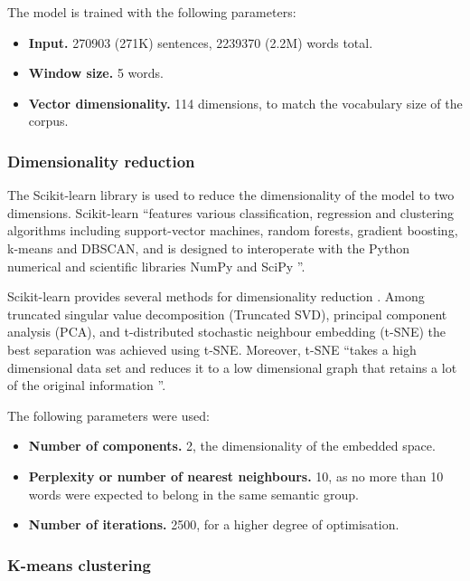 \documentclass[14pt, a4paper]{extreport}
\begin{document}
The model is trained with the following parameters:

\begin{itemize}
  \item \textbf{Input.} 270903 (271K) sentences, 2239370 (2.2M) words total.
  \item \textbf{Window size.} 5 words.
  \item \textbf{Vector dimensionality.} 114 dimensions, to match the vocabulary size of the corpus.
\end{itemize}
      \subsubsection{Dimensionality reduction}
The Scikit-learn library is used to reduce the dimensionality of the model to two dimensions. Scikit-learn ``features various classification, regression and clustering algorithms including support-vector machines, random forests, gradient boosting, k-means and DBSCAN, and is designed to interoperate with the Python numerical and scientific libraries NumPy and SciPy \parencite{scikit}''.

Scikit-learn provides several methods for dimensionality reduction \parencite{tsne}. Among truncated singular value decomposition (Truncated SVD), principal component analysis (PCA), and t-distributed stochastic neighbour embedding (t-SNE) the best separation was achieved using t-SNE. Moreover, t-SNE ``takes a high dimensional data set and reduces it to a low dimensional graph that retains a lot of the original information \parencite{dimred}''.

The following parameters were used:

\begin{itemize}
  \item \textbf{Number of components.} 2, the dimensionality of the embedded space.
  \item \textbf{Perplexity or number of nearest neighbours.} 10, as no more than 10 words were expected to belong in the same semantic group.
  \item \textbf{Number of iterations.} 2500, for a higher degree of optimisation.
\end{itemize}
      \subsubsection{K-means clustering}
\end{document}
